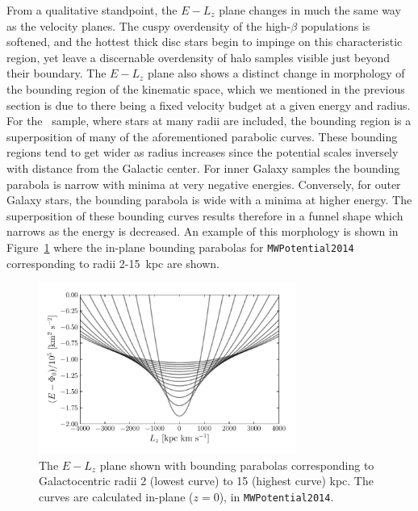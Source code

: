 From a qualitative standpoint, the $E-L_{z}$ plane changes in much the same way as the velocity planes. The cuspy overdensity of the high-$\beta$ populations is softened, and the hottest thick disc stars begin to impinge on this characteristic region, yet leave a discernable overdensity of halo samples visible just beyond their boundary. The $E-L_{z}$ plane also shows a distinct change in morphology of the bounding region of the kinematic space, which we mentioned in the previous section is due to there being a fixed velocity budget at a given energy and radius. For the \survey\ sample, where stars at many radii are included, the bounding region is a superposition of many of the aforementioned parabolic curves. These bounding regions tend to get wider as radius increases since the potential scales inversely with distance from the Galactic center. For inner Galaxy samples the bounding parabola is narrow with minima at very negative energies. Conversely, for outer Galaxy stars, the bounding parabola is wide with a minima at higher energy. The superposition of these bounding curves results therefore in a funnel shape which narrows as the energy is decreased. An example of this morphology is shown in Figure~\ref{ch2:fig:ELzBoundaries} where the in-plane bounding parabolas for \texttt{MWPotential2014} corresponding to radii 2-15~kpc are shown.

\begin{figure}
    \centering
    \includegraphics[width=0.75\textwidth]{figure/ch2/ELzBoundingParabolas.pdf}
    \caption{The $E-L_{z}$ plane shown with bounding parabolas corresponding to Galactocentric radii 2 (lowest curve) to 15 (highest curve) kpc. The curves are calculated in-plane ($z=0$), in \texttt{MWPotential2014}.}
    \label{ch2:fig:ELzBoundaries}
\end{figure}

